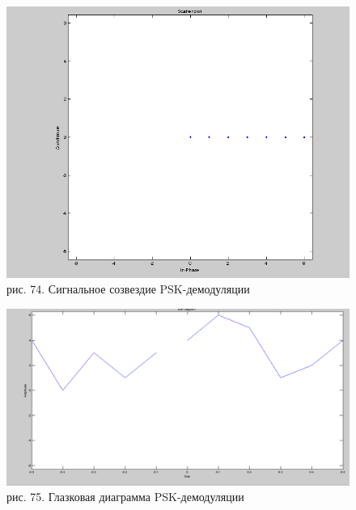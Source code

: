 \documentclass[10pt,a4paper]{report}
\begin{document}
\begin{figure}
\begin{center}
\includegraphics[width=150mm, scale = 0.9]{9_7}\newline
рис. 74. Сигнальное созвездие PSK-демодуляции\newline
\end{center}
\end{figure}
\begin{figure}
\begin{center}
\includegraphics[width=150mm, scale = 0.9]{9_8}\newline
рис. 75. Глазковая диаграмма PSK-демодуляции\newline
\end{center}
\end{figure}
\end{document}
